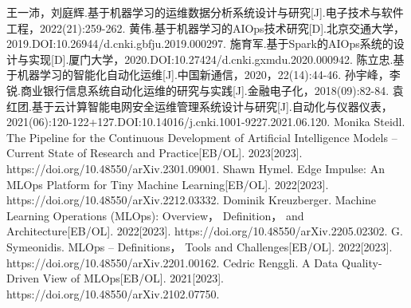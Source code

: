 \documentclass{HDU-Bachelor-Thesis}
\begin{document}
\begin{thebibliography}{99}
王一沛，刘庭辉.基于机器学习的运维数据分析系统设计与研究[J].电子技术与软件工程，2022(21):259-262.
黄伟.基于机器学习的AIOps技术研究[D].北京交通大学，2019.DOI:10.26944/d.cnki.gbfju.2019.000297.
施育军.基于Spark的AIOps系统的设计与实现[D].厦门大学，2020.DOI:10.27424/d.cnki.gxmdu.2020.000942.
陈立忠.基于机器学习的智能化自动化运维[J].中国新通信，2020，22(14):44-46.
孙宇峰，李锐.商业银行信息系统自动化运维的研究与实践[J].金融电子化，2018(09):82-84.
袁红团.基于云计算智能电网安全运维管理系统设计与研究[J].自动化与仪器仪表，2021(06):120-122+127.DOI:10.14016/j.cnki.1001-9227.2021.06.120.
Monika Steidl. The Pipeline for the Continuous Development of Artificial Intelligence Models -- Current State of Research and Practice[EB/OL]. 2023[2023]. https://doi.org/10.48550/arXiv.2301.09001.
Shawn Hymel. Edge Impulse: An MLOps Platform for Tiny Machine Learning[EB/OL]. 2022[2023]. https://doi.org/10.48550/arXiv.2212.03332.
Dominik Kreuzberger. Machine Learning Operations (MLOps): Overview， Definition， and Architecture[EB/OL]. 2022[2023]. https://doi.org/10.48550/arXiv.2205.02302.
G. Symeonidis. MLOps -- Definitions， Tools and Challenges[EB/OL]. 2022[2023]. https://doi.org/10.48550/arXiv.2201.00162.
Cedric Renggli. A Data Quality-Driven View of MLOps[EB/OL]. 2021[2023]. https://doi.org/10.48550/arXiv.2102.07750.
\end{thebibliography} 

\clearpage
{}
\end{document}
